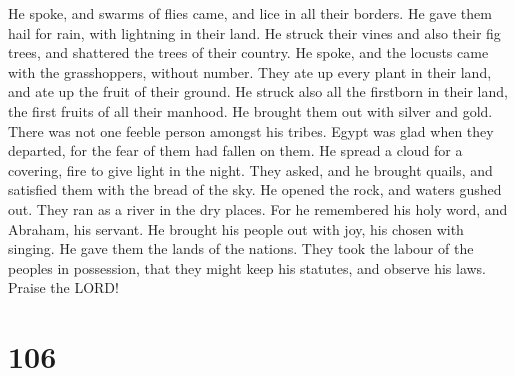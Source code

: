  He spoke, and swarms of flies came, and lice in all
their borders.  He gave them hail for rain, with
lightning in their land.  He struck their vines and also
their fig trees, and shattered the trees of their country.
 He spoke, and the locusts came with the grasshoppers,
without number.  They ate up every plant in their land,
and ate up the fruit of their ground.  He struck also all
the firstborn in their land, the first fruits of all their manhood.
 He brought them out with silver and gold. There was not
one feeble person amongst his tribes.  Egypt was glad
when they departed, for the fear of them had fallen on them.
 He spread a cloud for a covering, fire to give light in
the night.  They asked, and he brought quails, and
satisfied them with the bread of the sky.  He opened the
rock, and waters gushed out. They ran as a river in the dry places.
 For he remembered his holy word, and Abraham, his
servant.  He brought his people out with joy, his chosen
with singing.  He gave them the lands of the nations.
They took the labour of the peoples in possession,  that
they might keep his statutes, and observe his laws. Praise the LORD!

\hypertarget{section-98}{%
\section{106}\label{section-98}}

